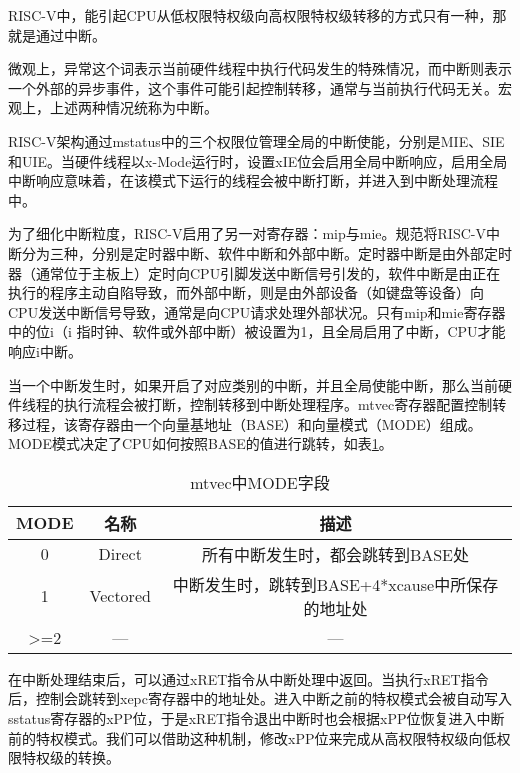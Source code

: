 RISC-V中，能引起CPU从低权限特权级向高权限特权级转移的方式只有一种，那就是通过中断。

微观上，异常这个词表示当前硬件线程中执行代码发生的特殊情况，而中断则表示一个外部的异步事件，这个事件可能引起控制转移，通常与当前执行代码无关。宏观上，上述两种情况统称为中断。

RISC-V架构通过mstatus中的三个权限位管理全局的中断使能，分别是MIE、SIE和UIE。当硬件线程以x-Mode运行时，设置xIE位会启用全局中断响应，启用全局中断响应意味着，在该模式下运行的线程会被中断打断，并进入到中断处理流程中。

为了细化中断粒度，RISC-V启用了另一对寄存器：mip与mie。规范将RISC-V中断分为三种，分别是定时器中断、软件中断和外部中断。定时器中断是由外部定时器（通常位于主板上）定时向CPU引脚发送中断信号引发的，软件中断是由正在执行的程序主动自陷导致，而外部中断，则是由外部设备（如键盘等设备）向CPU发送中断信号导致，通常是向CPU请求处理外部状况。只有mip和mie寄存器中的位i（i 指时钟、软件或外部中断）被设置为1，且全局启用了中断，CPU才能响应i中断。

当一个中断发生时，如果开启了对应类别的中断，并且全局使能中断，那么当前硬件线程的执行流程会被打断，控制转移到中断处理程序。mtvec寄存器配置控制转移过程，该寄存器由一个向量基地址（BASE）和向量模式（MODE）组成。MODE模式决定了CPU如何按照BASE的值进行跳转，如表\ref{tab:mtvec}。

\begin{table}[h]
	\centering
	\setlength{\belowcaptionskip}{2pt}
	\caption{mtvec中MODE字段}
	\label{tab:mtvec}
	\begin{tabular}{|c|c|c|}
		\hline
		MODE             & 名称       & 描述                                        \\ \hline
		0                & Direct   & 所有中断发生时，都会跳转到BASE处                        \\ \hline
		1                & Vectored & 中断发生时，跳转到BASE+4*xcause中所保存的地址处 \\ \hline
		\textgreater{}=2 & —        & —                                         \\ \hline
	\end{tabular}
\end{table}

在中断处理结束后，可以通过xRET指令从中断处理中返回。当执行xRET指令后，控制会跳转到xepc寄存器中的地址处。进入中断之前的特权模式会被自动写入 sstatus寄存器的xPP位，于是xRET指令退出中断时也会根据xPP位恢复进入中断前的特权模式。我们可以借助这种机制，修改xPP位来完成从高权限特权级向低权限特权级的转换。

